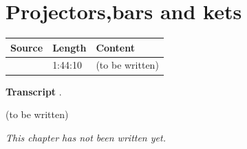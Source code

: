 \chapter{Projectors,bars and kets}\label{ch:c24}
\begin{paracol}{2}

\begin{sources}
\begin{tabularx}{\linewidth}{@{}l l L@{}}
\toprule
\textbf{Source} & \textbf{Length} & \textbf{Content}\\
\midrule
{} & 1:44:10 & (to be written)\\
\bottomrule
\end{tabularx}

\smallskip
\textbf{Transcript} .
\end{sources}

\begin{reading}
(to be written)
\end{reading}

\emph{This chapter has not been written yet.}

\flushside
\end{paracol}
